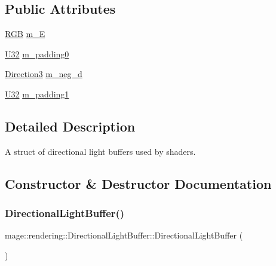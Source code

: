 \subsection*{Public Attributes}
\begin{DoxyCompactItemize}
\item 
\mbox{\hyperlink{structmage_1_1_r_g_b}{R\+GB}} \mbox{\hyperlink{structmage_1_1rendering_1_1_directional_light_buffer_aeaaec31da683b9ef189e775511db637a}{m\+\_\+E}}
\item 
\mbox{\hyperlink{namespacemage_a41c104c036fba3756a74e19f793eeaa1}{U32}} \mbox{\hyperlink{structmage_1_1rendering_1_1_directional_light_buffer_a82d9a78edf5562c3ce041d1a2a7b6a3e}{m\+\_\+padding0}}
\item 
\mbox{\hyperlink{structmage_1_1_direction3}{Direction3}} \mbox{\hyperlink{structmage_1_1rendering_1_1_directional_light_buffer_acbf55b6ed38011a695cb1feac90a64ed}{m\+\_\+neg\+\_\+d}}
\item 
\mbox{\hyperlink{namespacemage_a41c104c036fba3756a74e19f793eeaa1}{U32}} \mbox{\hyperlink{structmage_1_1rendering_1_1_directional_light_buffer_a9e86dcc4f68340eb64408cf638996a69}{m\+\_\+padding1}}
\end{DoxyCompactItemize}


\subsection{Detailed Description}
A struct of directional light buffers used by shaders. 

\subsection{Constructor \& Destructor Documentation}
\mbox{\label{structmage_1_1rendering_1_1_directional_light_buffer_a618dbd63423f0f008ef18c5e5a7fe560}} 
\subsubsection{\texorpdfstring{Directional\+Light\+Buffer()}{DirectionalLightBuffer()}\hspace{0.1cm}{\footnotesize\ttfamily [1/3]}}
{\footnotesize\ttfamily mage\+::rendering\+::\+Directional\+Light\+Buffer\+::\+Directional\+Light\+Buffer (\begin{DoxyParamCaption}{ }\end{DoxyParamCaption})\hspace{0.3cm}{\ttfamily [noexcept]}}

